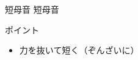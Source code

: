 \documentclass[aspectratio=169, xcolor={dvipsnames,table}]{beamer}
\begin{document}
\begin{frame}[plain]{短母音 }
  {\Large 短母音} {\Huge {}}

  \vspace*{20pt}

  \normalsize ポイント

  \begin{itemize}
    [circle]

    \item 力を抜いて短く（ぞんざいに）
  \end{itemize}

  \hfill\hyperlink{ex}{}%
\end{frame}
\end{document}
